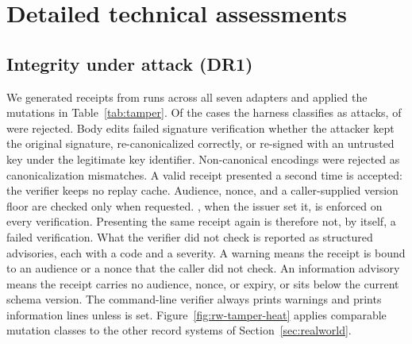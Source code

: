 \section{Detailed technical assessments}\label{app:technical-details}

\subsection{Integrity under attack (DR1)}

We generated \TamperBase{} receipts from runs across all seven adapters and applied the mutations in Table~\ref{tab:tamper}. Of the cases the harness classifies as attacks, \TamperRejected{} of \TamperAttacks{} were rejected. Body edits failed signature verification whether the attacker kept the original signature, re-canonicalized correctly, or re-signed with an untrusted key under the legitimate key identifier. Non-canonical encodings were rejected as canonicalization mismatches. A valid receipt presented a second time is accepted: the verifier keeps no replay cache. Audience, nonce, and a caller-supplied version floor are checked only when requested. , when the issuer set it, is enforced on every verification. Presenting the same receipt again is therefore not, by itself, a failed verification. What the verifier did not check is reported as structured advisories, each with a code and a severity. A warning means the receipt is bound to an audience or a nonce that the caller did not check. An information advisory means the receipt carries no audience, nonce, or expiry, or sits below the current schema version. The command-line verifier always prints warnings and prints information lines unless  is set. Figure~\ref{fig:rw-tamper-heat} applies comparable mutation classes to the other record systems of Section~\ref{sec:realworld}.

